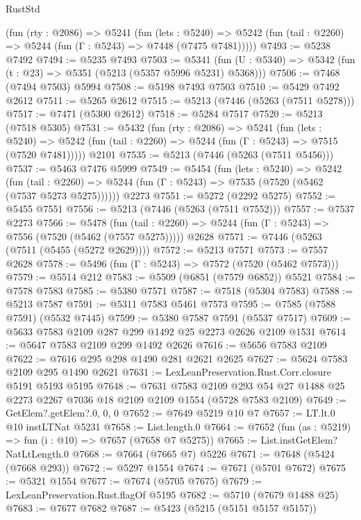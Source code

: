\begin{lexlean}{RustStd}
\begin{coremodule}
    (fun (rty : @2086) =>
    @5241
      (fun (lets : @5240) =>
      @5242 (fun (tail : @2260) => @5244 (fun (Γ : @5243) => @7448 (@7475 @7481)))))
@7493 := @5238 @7492
@7494 := @5235 @7493
@7503 := @5341 (fun (U : @5340) => @5342 (fun (t : @23) => @5351 (@5213 (@5357 @5996 @5231) @5368)))
@7506 := @7468 (@7494 @7503) @5994
@7508 := @5198 @7493 @7503
@7510 := @5429 @7492 @2612
@7511 := @5265 @2612
@7515 := @5213 (@7446 (@5263 (@7511 @5278)))
@7517 := @7471 (@5300 @2612)
@7518 := @5284 @7517
@7520 := @5213 (@7518 @5305)
@7531 := @5432
    (fun (rty : @2086) =>
    @5241
      (fun (lets : @5240) =>
      @5242 (fun (tail : @2260) => @5244 (fun (Γ : @5243) => @7515 (@7520 @7481)))))
    @2101
@7535 := @5213 (@7446 (@5263 (@7511 @5456)))
@7537 := @5463 @7476 @5999
@7549 := @5454
    (fun (lets : @5240) =>
    @5242
      (fun (tail : @2260) => @5244 (fun (Γ : @5243) => @7535 (@7520 (@5462 (@7537 @5273 @5275))))))
    @2273
@7551 := @5272 (@2292 @5275)
@7552 := @5455 @7551
@7556 := @5213 (@7446 (@5263 (@7511 @7552)))
@7557 := @7537 @2273
@7566 := @5478
    (fun (tail : @2260) => @5244 (fun (Γ : @5243) => @7556 (@7520 (@5462 (@7557 @5275)))))
    @2628
@7571 := @7446 (@5263 (@7511 (@5455 (@5272 @2629))))
@7572 := @5213 @7571
@7573 := @7557 @2628
@7578 := @5496 (fun (Γ : @5243) => @7572 (@7520 (@5462 @7573)))
@7579 := @5514 @212
@7583 := @5509 (@6851 (@7579 @6852)) @5521
@7584 := @7578 @7583
@7585 := @5380 @7571
@7587 := @7518 (@5304 @7583)
@7588 := @5213 @7587
@7591 := @5311 @7583 @5461 @7573
@7595 := @7585 (@7588 @7591) (@5532 @7445)
@7599 := @5380 @7587 @7591 (@5537 @7517)
@7609 := @5633 @7583 @2109 @287 @299 @1492 @25 @2273 @2626 @2109 @1531
@7614 := @5647 @7583 @2109 @299 @1492 @2626
@7616 := @5656 @7583 @2109
@7622 := @7616 @295 @298 @1490 @281 @2621 @2625
@7627 := @5624 @7583 @2109 @295 @1490 @2621
@7631 := LexLeanPreservation.Rust.Corr.closure @5191 @5193 @5195
@7648 := @7631
    @7583
    @2109
    @293
    @54
    @27
    @1488
    @25
    @2273
    @2267
    @7036
    @18
    @2109
    @2109
    @1554
    (@5728 @7583 @2109)
@7649 := GetElem?.getElem?.{0, 0, 0}
@7652 := @7649 @5219 @10 @7
@7657 := LT.lt.{0} @10 instLTNat @5231
@7658 := List.length.{0}
@7664 := @7652 (fun (as : @5219) => fun (i : @10) => @7657 (@7658 @7 @5275))
@7665 := List.instGetElem?NatLtLength.{0}
@7668 := @7664 (@7665 @7) @5226
@7671 := @7648 (@5424 (@7668 @293))
@7672 := @5297 @1554
@7674 := @7671 (@5701 @7672)
@7675 := @5321 @1554
@7677 := @7674 (@5705 @7675)
@7679 := LexLeanPreservation.Rust.flagOf @5195
@7682 := @5710 (@7679 @1488 @25)
@7683 := @7677 @7682
@7687 := @5423 (@5215 (@5151 @5157 @5157))

\end{coremodule}
\end{lexlean}
